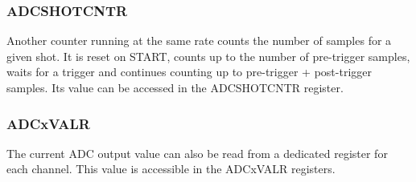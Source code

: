 \documentclass{article}
\begin{document}
\subsubsection{ADCSHOTCNTR}
Another counter running at the same rate counts the number of samples for a given shot. It is reset on START, counts up to the number of pre-trigger samples, waits for a trigger and continues counting up to pre-trigger + post-trigger samples. Its value can be accessed in the ADCSHOTCNTR register.

\subsubsection{ADCxVALR}
The current ADC output value can also be read from a dedicated register for each channel. This value is accessible in the ADCxVALR registers.
\end{document}
